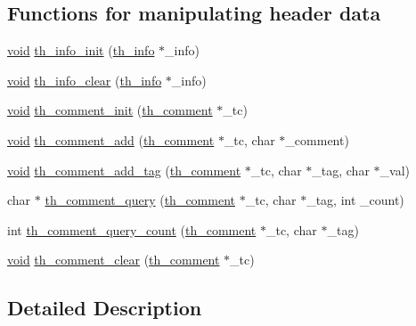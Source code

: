 \subsection*{Functions for manipulating header data}
\begin{DoxyCompactItemize}
\item 
\hyperlink{png_8h_ac9c84fa68bbad002983e35ce3663c686}{void} \hyperlink{group__basefuncs_ga430d9c605816a6ca0bdce3a0b965b926}{th\+\_\+info\+\_\+init} (\hyperlink{structth__info}{th\+\_\+info} $\ast$\+\_\+info)
\item 
\hyperlink{png_8h_ac9c84fa68bbad002983e35ce3663c686}{void} \hyperlink{group__basefuncs_gab3d6441ab4a4969859ef5fd78a9e3c1c}{th\+\_\+info\+\_\+clear} (\hyperlink{structth__info}{th\+\_\+info} $\ast$\+\_\+info)
\item 
\hyperlink{png_8h_ac9c84fa68bbad002983e35ce3663c686}{void} \hyperlink{group__basefuncs_ga6c8ab25988e7ea9d7b1e31a54cf58f09}{th\+\_\+comment\+\_\+init} (\hyperlink{structth__comment}{th\+\_\+comment} $\ast$\+\_\+tc)
\item 
\hyperlink{png_8h_ac9c84fa68bbad002983e35ce3663c686}{void} \hyperlink{group__basefuncs_ga19a1f7b8032db957df151a34e5ac9272}{th\+\_\+comment\+\_\+add} (\hyperlink{structth__comment}{th\+\_\+comment} $\ast$\+\_\+tc, char $\ast$\+\_\+comment)
\item 
\hyperlink{png_8h_ac9c84fa68bbad002983e35ce3663c686}{void} \hyperlink{group__basefuncs_ga6c5edc201ca220a30787ca6c1ddcaeaf}{th\+\_\+comment\+\_\+add\+\_\+tag} (\hyperlink{structth__comment}{th\+\_\+comment} $\ast$\+\_\+tc, char $\ast$\+\_\+tag, char $\ast$\+\_\+val)
\item 
char $\ast$ \hyperlink{group__basefuncs_ga33c8b4f57a03217636d704c2ebb211fa}{th\+\_\+comment\+\_\+query} (\hyperlink{structth__comment}{th\+\_\+comment} $\ast$\+\_\+tc, char $\ast$\+\_\+tag, int \+\_\+count)
\item 
int \hyperlink{group__basefuncs_ga81d518dc4426f63ceaedcbe2668679fc}{th\+\_\+comment\+\_\+query\+\_\+count} (\hyperlink{structth__comment}{th\+\_\+comment} $\ast$\+\_\+tc, char $\ast$\+\_\+tag)
\item 
\hyperlink{png_8h_ac9c84fa68bbad002983e35ce3663c686}{void} \hyperlink{group__basefuncs_gae736c1afa514947a3feb223143af95e3}{th\+\_\+comment\+\_\+clear} (\hyperlink{structth__comment}{th\+\_\+comment} $\ast$\+\_\+tc)
\end{DoxyCompactItemize}


\subsection{Detailed Description}


